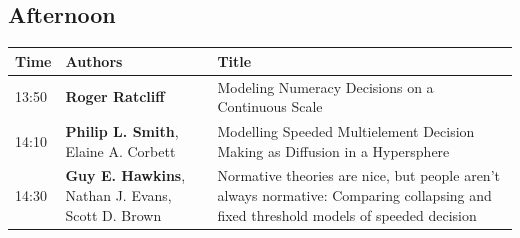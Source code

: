 \documentclass[]{article}
\begin{document}
\subsection{Afternoon}\label{afternoon-1}

\begin{longtable}[]{@{}lll@{}}
\toprule
\begin{minipage}[b]{0.03\columnwidth}\raggedright\strut
Time\strut
\end{minipage} & \begin{minipage}[b]{0.32\columnwidth}\raggedright\strut
Authors\strut
\end{minipage} & \begin{minipage}[b]{0.57\columnwidth}\raggedright\strut
Title\strut
\end{minipage}\tabularnewline
\midrule
\endhead
\begin{minipage}[t]{0.03\columnwidth}\raggedright\strut
13:50\strut
\end{minipage} & \begin{minipage}[t]{0.32\columnwidth}\raggedright\strut
\textbf{Roger Ratcliff}\strut
\end{minipage} & \begin{minipage}[t]{0.57\columnwidth}\raggedright\strut
Modeling Numeracy Decisions on a Continuous Scale\strut
\end{minipage}\tabularnewline
\begin{minipage}[t]{0.03\columnwidth}\raggedright\strut
14:10\strut
\end{minipage} & \begin{minipage}[t]{0.32\columnwidth}\raggedright\strut
\textbf{Philip L. Smith}, Elaine A. Corbett\strut
\end{minipage} & \begin{minipage}[t]{0.57\columnwidth}\raggedright\strut
Modelling Speeded Multielement Decision Making as Diffusion in a
Hypersphere\strut
\end{minipage}\tabularnewline
\begin{minipage}[t]{0.03\columnwidth}\raggedright\strut
14:30\strut
\end{minipage} & \begin{minipage}[t]{0.32\columnwidth}\raggedright\strut
\textbf{Guy E. Hawkins}, Nathan J. Evans, Scott D. Brown\strut
\end{minipage} & \begin{minipage}[t]{0.57\columnwidth}\raggedright\strut
Normative theories are nice, but people aren't always normative:
Comparing collapsing and fixed threshold models of speeded decision

\end{minipage}
\end{longtable}
\end{document}
